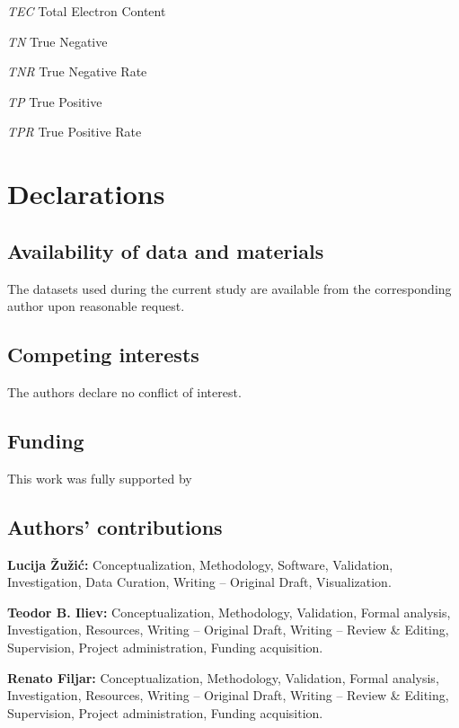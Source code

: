 \documentclass[sn-mathphys-num]{sn-jnl}%
\begin{document}
\textit{TEC} Total Electron Content

\textit{TN} True Negative

\textit{TNR} True Negative Rate

\textit{TP} True Positive

\textit{TPR} True Positive Rate





\section{Declarations}

\subsection{Availability of data and materials}

The datasets used during the current study are available from the corresponding author upon reasonable request.

\subsection{Competing interests}

The authors declare no conflict of interest.

\subsection{Funding}

This work was fully supported by

\subsection{Authors' contributions}

\textbf{Lucija Žužić:} Conceptualization, Methodology, Software, Validation, Investigation, Data Curation, Writing -- Original Draft, Visualization.

\textbf{Teodor B. Iliev:} Conceptualization, Methodology, Validation, Formal analysis, Investigation, Resources, Writing -- Original Draft, Writing -- Review \& Editing, Supervision, Project administration, Funding acquisition.

\textbf{Renato Filjar:} Conceptualization, Methodology, Validation, Formal analysis, Investigation, Resources, Writing -- Original Draft, Writing -- Review \& Editing, Supervision, Project administration, Funding acquisition.
\end{document}
